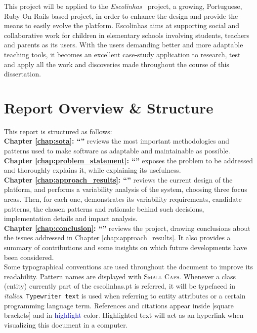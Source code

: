 This project will be applied to the \textit{Escolinhas}~\cite{escolinhas} project, a growing, Portuguese, Ruby On Rails based project, in order to enhance the design and provide the means to easily evolve the platform. Escolinhas aims at supporting social and collaborative work for children in elementary schools involving students, teachers and parents as its users. With the users demanding better and more adaptable teaching tools, it becomes an excellent case-study application to research, test and apply all the work and discoveries made throughout the course of this dissertation.

\section{Report Overview \& Structure}\label{sec:structure}

This report is structured as follows:\\

\textbf{Chapter \ref{chap:sota}: ``'' } reviews the most important methodologies and patterns used to make software as adaptable and maintainable as possible.\\

\textbf{Chapter \ref{chap:problem_statement}: ``'' } exposes the problem to be addressed and thoroughly explains it, while explaining its usefulness.\\

\textbf{Chapter \ref{chap:approach_results}: ``'' } reviews the current design of the platform, and performs a variability analysis of the system, choosing three focus areas. Then, for each one, demonstrates its variability requirements, candidate patterns, the chosen patterns and rationale behind such decisions, implementation details and impact analysis.\\


\textbf{Chapter \ref{chap:conclusion}: ``'' } reviews the project, drawing conclusions about the issues addressed in Chapter \ref{chap:approach_results}. It also provides a summary of contributions and some insights on which future developments have been considered.\\

Some typographical conventions are used throughout the document to improve its readability. Pattern names are displayed with \textsc{Small Caps}. Whenever a class (entity) currently part of the escolinhas.pt is referred, it will be typefaced in \textit{italics}. \texttt{Typewriter text} is used when referring to entity attributes or a certain programming language term. References and citations appear inside [square brackets] and in \textcolor{blue}{highlight} color. Highlighted text will act as an hyperlink when visualizing this document in a computer.

